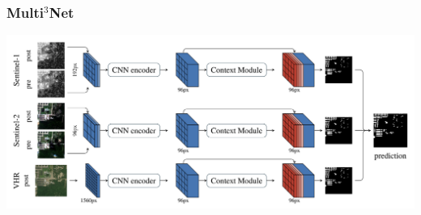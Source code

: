 \begin{frame}
\frametitle{Multi$^3$Net}

\includegraphics[width=\textwidth]{images/multi3net}


%
%
%
%
%
%
%
%


\end{frame}


